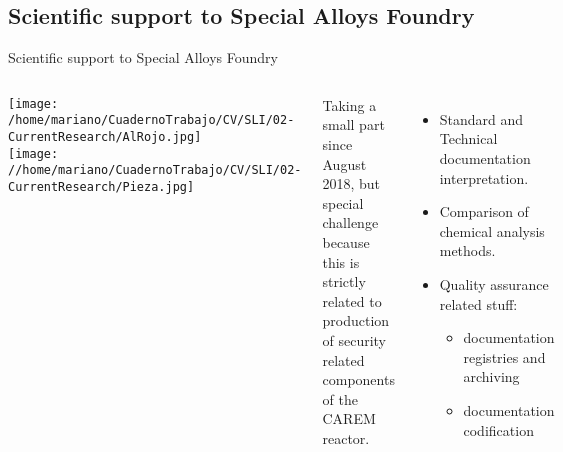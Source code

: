 \subsection{Scientific support to Special Alloys Foundry}

\begin{frame}{Scientific support to Special Alloys Foundry}
  \begin{columns}

    \texttt{[image: /home/mariano/CuadernoTrabajo/CV/SLI/02-CurrentResearch/AlRojo.jpg]}
    \\
    \texttt{[image: //home/mariano/CuadernoTrabajo/CV/SLI/02-CurrentResearch/Pieza.jpg]}

  Taking a small part since August 2018, but special challenge because this is 
  strictly related to production of security related components of the CAREM 
  reactor. 

  \begin{itemize}
    \item Standard and Technical documentation interpretation.
    \item Comparison of chemical analysis methods.
    \item Quality assurance related stuff: 
      \begin{itemize}
	  \item documentation registries and archiving
	    \item documentation codification
      \end{itemize} 
  \end{itemize}

  \end{columns}

\end{frame}

